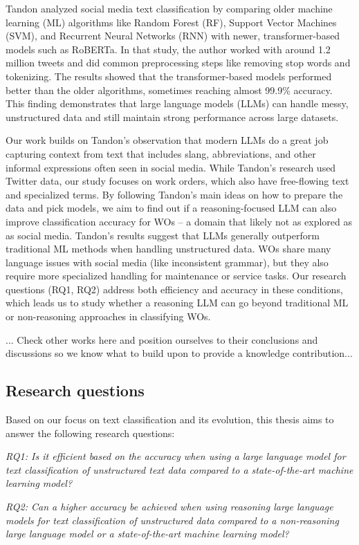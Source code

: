 Tandon \cite{tandon2024social} analyzed social media text classification by comparing older machine learning (ML) algorithms like Random Forest (RF), Support Vector Machines (SVM), and Recurrent Neural Networks (RNN) with newer, transformer-based models such as RoBERTa. In that study, the author worked with around 1.2 million tweets and did common preprocessing steps like removing stop words and tokenizing. The results showed that the transformer-based models performed better than the older algorithms, sometimes reaching almost 99.9\% accuracy. This finding demonstrates that large language models (LLMs) can handle messy, unstructured data and still maintain strong performance across large datasets.

Our work builds on Tandon’s observation that modern LLMs do a great job capturing context from text that includes slang, abbreviations, and other informal expressions often seen in social media. While Tandon’s research used Twitter data, our study focuses on work orders, which also have free-flowing text and specialized terms. By following Tandon’s main ideas on how to prepare the data and pick models, we aim to find out if a reasoning-focused LLM can also improve classification accuracy for WOs -- a domain that likely not as explored as as social media. Tandon’s results suggest that LLMs generally outperform traditional ML methods when handling unstructured data. WOs share many language issues with social media (like inconsistent grammar), but they also require more specialized handling for maintenance or service tasks. Our research questions (RQ1, RQ2) address both efficiency and accuracy in these conditions, which leads us to study whether a reasoning LLM can go beyond traditional ML or non-reasoning approaches in classifying WOs.

... Check other works here and position ourselves to their conclusions and discussions so we know what to build upon to provide a knowledge contribution...

\subsection{Research questions}

Based on our focus on text classification and its evolution, this thesis aims to answer the following research questions:

\bigskip
\textit{RQ1: Is it efficient based on the accuracy when using a large language model for text classification of unstructured text data compared to a state-of-the-art machine learning model?}

\bigskip
\textit{RQ2: Can a higher accuracy be achieved when using reasoning large language models for text classification of unstructured data compared to a non-reasoning large language model or a state-of-the-art machine learning model?}